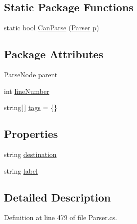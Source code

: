 \subsection*{Static Package Functions}
\begin{DoxyCompactItemize}
\item 
static bool \hyperlink{a00140_a1ffeca22df52451120cb362f90fd4e9f}{Can\-Parse} (\hyperlink{a00143}{Parser} p)
\end{DoxyCompactItemize}
\subsection*{Package Attributes}
\begin{DoxyCompactItemize}
\item 
\hyperlink{a00142}{Parse\-Node} \hyperlink{a00142_af313a82103fcc2ff5a177dbb06b92f7b}{parent}
\item 
int \hyperlink{a00142_a18b493382de0fde5b4299c1bd2250075}{line\-Number}
\item 
string\mbox{[}$\,$\mbox{]} \hyperlink{a00142_a58b3a15788fd2d4127d73619dc6d04ae}{tags} = \{\}
\end{DoxyCompactItemize}
\subsection*{Properties}
\begin{DoxyCompactItemize}
\item 
string \hyperlink{a00140_abbe56fba06169901508e6c659f06c236}{destination}
\item 
string \hyperlink{a00140_a7f27d78e67fed6992767e995e70fc468}{label}
\end{DoxyCompactItemize}


\subsection{Detailed Description}


Definition at line 479 of file Parser.\-cs.



